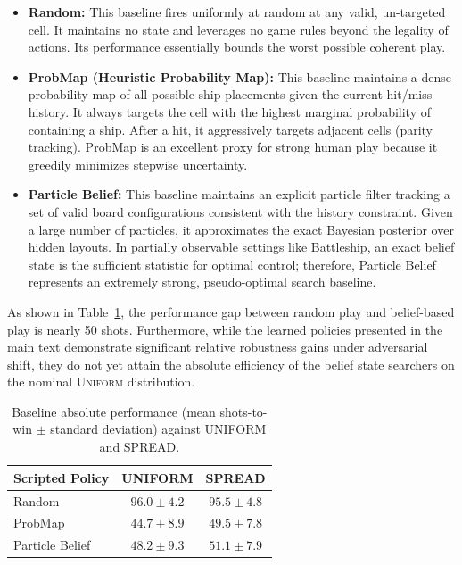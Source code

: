 \documentclass[11pt]{article}
\begin{document}
\begin{itemize}
    \item \textbf{Random:} This baseline fires uniformly at random at any valid, un-targeted cell. It maintains no state and leverages no game rules beyond the legality of actions. Its performance essentially bounds the worst possible coherent play.
    \item \textbf{ProbMap (Heuristic Probability Map):} This baseline maintains a dense probability map of all possible ship placements given the current hit/miss history. It always targets the cell with the highest marginal probability of containing a ship. After a hit, it aggressively targets adjacent cells (parity tracking). ProbMap is an excellent proxy for strong human play because it greedily minimizes stepwise uncertainty.
    \item \textbf{Particle Belief:} This baseline maintains an explicit particle filter tracking a set of valid board configurations consistent with the history constraint. Given a large number of particles, it approximates the exact Bayesian posterior over hidden layouts. In partially observable settings like Battleship, an exact belief state is the sufficient statistic for optimal control; therefore, Particle Belief represents an extremely strong, pseudo-optimal search baseline.
\end{itemize}

As shown in Table~\ref{tab:additional_baselines}, the performance gap between random play and belief-based play is nearly 50 shots. Furthermore, while the learned policies presented in the main text demonstrate significant relative robustness gains under adversarial shift, they do not yet attain the absolute efficiency of the belief state searchers on the nominal \textsc{Uniform} distribution.

\begin{table}[htbp]
\centering
\caption{Baseline absolute performance (mean shots-to-win $\pm$ standard deviation) against UNIFORM and SPREAD.}
\label{tab:additional_baselines}
\begin{tabular}{lcc}
\toprule
Scripted Policy & UNIFORM & SPREAD \\
\midrule
Random & $96.0 \pm 4.2$ & $95.5 \pm 4.8$ \\
ProbMap & $44.7 \pm 8.9$ & $49.5 \pm 7.8$ \\
Particle Belief & $48.2 \pm 9.3$ & $51.1 \pm 7.9$ \\
\bottomrule
\end{tabular}
\end{table}
\clearpage
\end{document}
